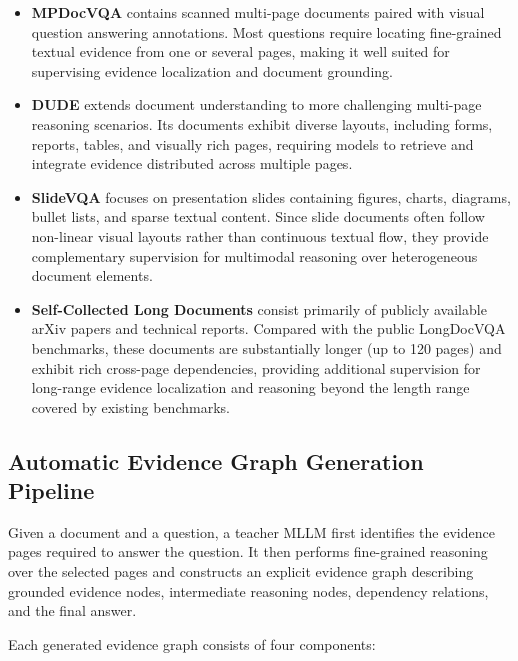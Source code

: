 \documentclass[letterpaper]{article} %
\begin{document}
\begin{itemize}

\item \textbf{MPDocVQA}
contains scanned multi-page documents paired with visual question answering annotations. Most questions require locating fine-grained textual evidence from one or several pages, making it well suited for supervising evidence localization and document grounding.

\item \textbf{DUDE}
extends document understanding to more challenging multi-page reasoning scenarios. Its documents exhibit diverse layouts, including forms, reports, tables, and visually rich pages, requiring models to retrieve and integrate evidence distributed across multiple pages.

\item \textbf{SlideVQA}
focuses on presentation slides containing figures, charts, diagrams, bullet lists, and sparse textual content. Since slide documents often follow non-linear visual layouts rather than continuous textual flow, they provide complementary supervision for multimodal reasoning over heterogeneous document elements.

\item \textbf{Self-Collected Long Documents}
consist primarily of publicly available arXiv papers and technical reports. Compared with the public LongDocVQA benchmarks, these documents are substantially longer (up to 120 pages) and exhibit rich cross-page dependencies, providing additional supervision for long-range evidence localization and reasoning beyond the length range covered by existing benchmarks.


\end{itemize}

\subsection{Automatic Evidence Graph Generation Pipeline}


Given a document and a question, a teacher MLLM first identifies the evidence pages required to answer the question. It then performs fine-grained reasoning over the selected pages and constructs an explicit evidence graph describing grounded evidence nodes, intermediate reasoning nodes, dependency relations, and the final answer.

Each generated evidence graph consists of four components:
\end{document}
